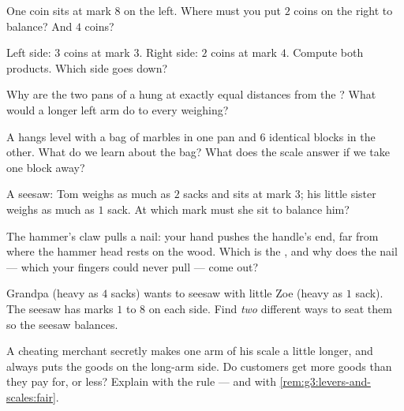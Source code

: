 \begin{exercise}[$\star$]\label{exo:g3:levers-and-scales:4}
One coin sits at mark $8$ on the left. Where must you put $2$ coins
on the right to balance? And $4$ coins?
\end{exercise}

\begin{exercise}[$\star$]\label{exo:g3:levers-and-scales:5}
Left side: $3$ coins at mark $3$. Right side: $2$ coins at mark $4$.
Compute both products. Which side goes down?
\end{exercise}

\begin{exercise}[$\star$]\label{exo:g3:levers-and-scales:6}
Why are the two pans of a  hung at exactly equal
distances from the ? What would a longer left arm do to every
weighing?
\end{exercise}

\begin{exercise}[$\star$]\label{exo:g3:levers-and-scales:7}
A  hangs level with a bag of marbles in one pan and $6$
identical blocks in the other. What do we learn about the bag? What
does the scale answer if we take one block away?
\end{exercise}

\begin{exercise}[$\star$]\label{exo:g3:levers-and-scales:8}
A seesaw: Tom weighs as much as $2$ sacks and sits at mark $3$; his
little sister weighs as much as $1$ sack. At which mark must she sit
to balance him?
\end{exercise}

\begin{exercise}[$\star$]\label{exo:g3:levers-and-scales:9}
The hammer's claw pulls a nail: your hand pushes the handle's end,
far from where the hammer head rests on the wood. Which is the
, and why does the nail --- which your fingers could never pull
--- come out?
\end{exercise}

\begin{exercise}[$\star\star$]\label{exo:g3:levers-and-scales:10}
Grandpa (heavy as $4$ sacks) wants to seesaw with little Zoe (heavy
as $1$ sack). The seesaw has marks $1$ to $8$ on each side. Find
\emph{two} different ways to seat them so the seesaw balances.
\end{exercise}

\begin{exercise}[$\star\star$]\label{exo:g3:levers-and-scales:11}
A cheating merchant secretly makes one arm of his scale a little
longer, and always puts the goods on the long-arm side. Do customers
get more goods than they pay for, or less? Explain with the 
rule --- and with \cref{rem:g3:levers-and-scales:fair}.
\end{exercise}

